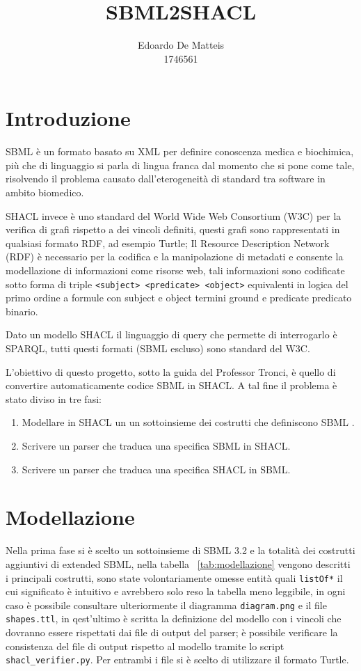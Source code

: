 \documentclass{article}
\title{SBML2SHACL}
\author{Edoardo De Matteis \\ 1746561}
\begin{document}
\maketitle
\tableofcontents

\clearpage

\section{Introduzione}
SBML è un formato basato su XML per definire conoscenza medica e biochimica, più che di linguaggio si parla di lingua franca dal momento che si pone come tale, risolvendo il problema causato dall'eterogeneità di standard tra software in ambito biomedico. 

SHACL invece è uno standard del World Wide Web Consortium (W3C) per la verifica di grafi rispetto a dei vincoli definiti, questi grafi sono rappresentati in qualsiasi formato RDF, ad esempio Turtle; Il Resource Description Network (RDF) è necessario per la codifica e la manipolazione di metadati e consente la modellazione di informazioni come risorse web, tali informazioni sono codificate sotto forma di triple \texttt{<subject> <predicate> <object>} equivalenti in logica del primo ordine a formule con subject e object termini ground e predicate predicato binario. 

Dato un modello SHACL il linguaggio di query che permette di interrogarlo è SPARQL, tutti questi formati (SBML escluso) sono standard del W3C. 

L'obiettivo di questo progetto, sotto la guida del Professor Tronci, è quello di convertire automaticamente codice SBML in SHACL. A tal fine il problema è stato diviso in tre fasi:

\begin{enumerate}
    \item Modellare in SHACL un un sottoinsieme dei costrutti che definiscono SBML . 
    \item Scrivere un parser che traduca una specifica SBML in SHACL.
    \item Scrivere un parser che traduca una specifica SHACL in SBML.
\end{enumerate}

\section{Modellazione}

Nella prima fase si è scelto un sottoinsieme di SBML 3.2 e la totalità dei costrutti aggiuntivi di extended SBML, nella tabella ~\ref{tab:modellazione} vengono descritti i principali costrutti, sono state volontariamente omesse entità quali \texttt{listOf*} il cui significato è intuitivo e avrebbero solo reso la tabella meno leggibile, in ogni caso è possibile consultare ulteriormente il diagramma \texttt{diagram.png} e il file \texttt{shapes.ttl}, in qest'ultimo è scritta la definizione del modello con i vincoli che dovranno essere rispettati dai file di output del parser; è possibile verificare la consistenza del file di output rispetto al modello tramite lo script \texttt{shacl\_verifier.py}. Per entrambi i file si è scelto di utilizzare il formato Turtle.
\end{document}
